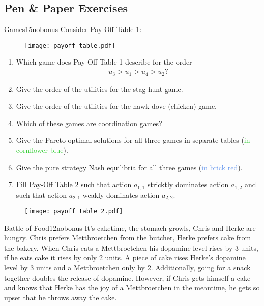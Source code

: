 \documentclass[twoside,english,colorbacktitle,accentcolor=tud9c,10pt]{tudexercise}
\begin{document}
\clearpage


\subsection{Pen \& Paper Exercises}

\begin{questions}

\begin{question}{Games}{15}{nobonus}
	Consider Pay-Off Table 1:
	\begin{figure}[h]
	\centering
		\texttt{[image: payoff\_table.pdf]}
	\end{figure}
	\begin{enumerate}
		\item Which game does Pay-Off Table 1 describe for the order
		\begin{align}
		    u_{3} > u_{1} > u_{4} > u_{2}? \nonumber
		\end{align}
		\item Give the order of the utilities for the stag hunt game.
		\item Give the order of the utilities for the hawk-dove (chicken) game.
		\item Which of these games are coordination games?
		\item Give the Pareto optimal solutions for all three games in separate tables (\textcolor{LimeGreen}{in cornflower blue}).
		\item Give the pure strategy Nash equilibria for all three games (\textcolor{CornflowerBlue}{in brick red}).
		\item Fill Pay-Off Table 2 such that action $a_{1,1}$ stricktly dominates action $a_{1,2}$ and such that action $a_{2,1}$ weakly dominates action $a_{2,2}$.
	\end{enumerate}
	\begin{figure}[h]
	\centering
		\texttt{[image: payoff\_table\_2.pdf]}
	\end{figure}
\end{question}

	
\begin{question}{Battle of Food}{12}{nobonus}
	It's caketime, the stomach growls, Chris and Herke are hungry.
	Chris prefers Mettbroetchen from the butcher, Herke prefers cake from the bakery.
	When Chris eats a Mettbroetchen his dopamine level rises by 3 units, if he eats cake it rises by only 2 units.
	A piece of cake rises Herke's dopamine level by 3 units and a Mettbroetchen only by 2.
	Additionally, going for a snack together doubles the release of dopamine.
	However, if Chris gets himself a cake and knows that Herke has the joy of a Mettbroetchen in the meantime, he gets so upset that he throws away the cake.


\end{question}
\end{questions}
\end{document}
